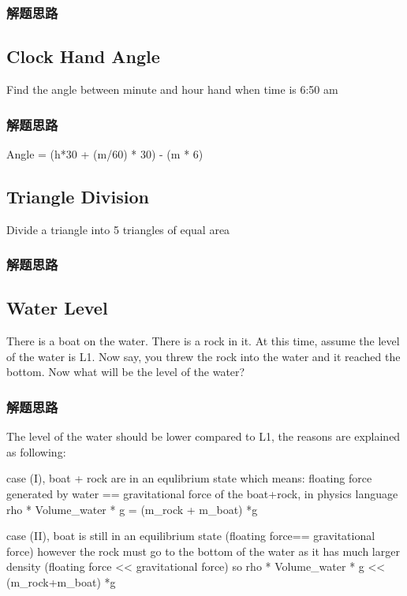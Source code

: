 \subsubsection{解题思路}

\subsection{Clock Hand Angle}
Find the angle between minute and hour hand when time is 6:50 am

\subsubsection{解题思路}
Angle = (h*30 + (m/60) * 30) - (m * 6)

\subsection{Triangle Division}
Divide a triangle into 5 triangles of equal area

\subsubsection{解题思路}

\subsection{Water Level}
There is a boat on the water. There is a rock in it. At this time, assume the level of the water is L1. Now say, you threw the rock into the water and it reached the bottom. Now 
what will be the level of the water?

\subsubsection{解题思路}
The level of the water should be lower compared to L1, the reasons are explained as following: 

case (I), boat + rock are in an equlibrium state which means: floating force generated by water == gravitational force of the boat+rock, in physics language 
rho * Volume_water * g = (m_rock + m_boat) *g 

case (II), boat is still in an equilibrium state (floating force== gravitational force) however the rock must go to the bottom of the water as it has much larger density (floating 
force << gravitational force) 
so rho * Volume_water * g << (m_rock+m_boat) *g 

